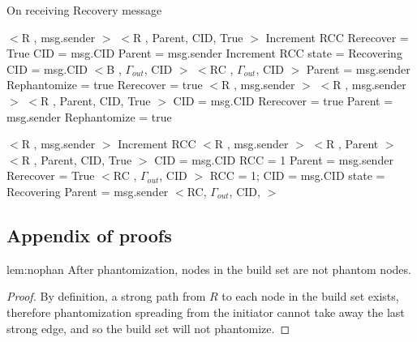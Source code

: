 \begin{algorithm}[H]
\caption{On receiving Recovery message}
\label{Recovery message received}
\scriptsize
\begin{algorithmic}[1]
	\State $<$R , msg.sender $>$
		\State $<$R , Parent, CID, True $>$
	\EndIf
	\State Increment RCC 
	\State Rerecover = True
	\State CID = msg.CID
	\State Parent = msg.sender
	\State Increment RCC
	\State state = Recovering
	\State CID = msg.CID
	\State $<$B , $\Gamma_{out}$, CID $>$
  \Else
	\State $<$RC , $\Gamma_{out}$, CID $>$
  \EndIf
	\State Parent = msg.sender
		\State Rephantomize = true
		\State Rerecover = true
		\State $<$R , msg.sender $>$
		\State $<$R , msg.sender $>$
	\Else
			\State $<$R , Parent, CID, True $>$
		\EndIf
		\State CID = msg.CID
		\State Rerecover = true
		\State Parent = msg.sender
		\State Rephantomize = true
	\EndIf
	\end{algorithmic}
\end{algorithm}
\begin{algorithm}[H]
\scriptsize
\begin{algorithmic}[1]
		\State $<$R , msg.sender $>$
		\State Increment RCC
		\State $<$R , msg.sender $>$
			\State $<$R , Parent $>$
		\EndIf
	\Else
			\State $<$R , Parent, CID, True $>$
		\EndIf
		\State CID = msg.CID
		\State RCC = 1
		\State Parent = msg.sender
			\State Rerecover = True	
		\Else 
			\State $<$RC , $\Gamma_{out}$, CID $>$
		\EndIf
	\EndIf
{}
	\State RCC = 1;
	\State CID = msg.CID
	\State state = Recovering
	\State Parent = msg.sender
	\State $<$RC,  $\Gamma_{out}$, CID, $>$
\EndIf
\EndProcedure
\end{algorithmic}
\end{algorithm}	

\subsection{Appendix of proofs}
\label{proofapp}
\begin{replemma}{lem:nophan}
After phantomization, nodes in the build set are not phantom nodes.
\end{replemma}
\begin{proof}
By definition, a strong path from $R$ to each node in the build set
exists, therefore phantomization spreading from the initiator cannot take
away the last strong edge, and so the build set will not phantomize.
\end{proof}

